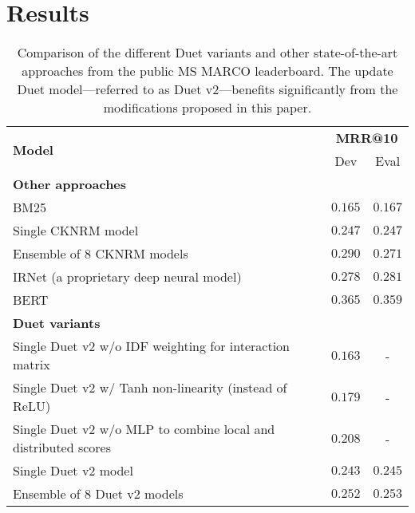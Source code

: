 \documentclass{article}
\begin{document}
 \section{Results}
\label{sec:result}

\begin{table}[t]
    \centering
    \caption{Comparison of the different Duet variants and other state-of-the-art approaches from the public MS MARCO leaderboard. The update Duet model---referred to as Duet v2---benefits significantly from the modifications proposed in this paper.}
    \begin{tabular}{lcc}
    \hline
    \hline
        \multirow{2}{*}{\textbf{Model}} & \multicolumn{2}{c}{\textbf{MRR@10}} \\
        & Dev & Eval \\
        \hline
        \multicolumn{3}{l}{\textbf{Other approaches}} \\
        BM25 & $0.165$ & $0.167$ \\
        Single CKNRM \citep{dai2018convolutional} model & $0.247$ & $0.247$ \\
        Ensemble of 8 CKNRM \citep{dai2018convolutional} models & $0.290$ & $0.271$ \\
        IRNet (a proprietary deep neural model) & $0.278$ & $0.281$ \\
        BERT \citep{nogueira2019passage} & $0.365$ & $0.359$ \\
        \hline
        \multicolumn{3}{l}{\textbf{Duet variants}} \\
        Single Duet v2 w/o IDF weighting for interaction matrix & $0.163$ & - \\
        Single Duet v2 w/ Tanh non-linearity (instead of ReLU) & $0.179$ & - \\
        Single Duet v2 w/o MLP to combine local and distributed scores & $0.208$ & - \\
        Single Duet v2 model & $0.243$ & $0.245$ \\
        Ensemble of 8 Duet v2 models & $0.252$ & $0.253$ \\
        \hline
        \hline
    \end{tabular}
    \label{tbl:results}
\end{table}
\end{document}
